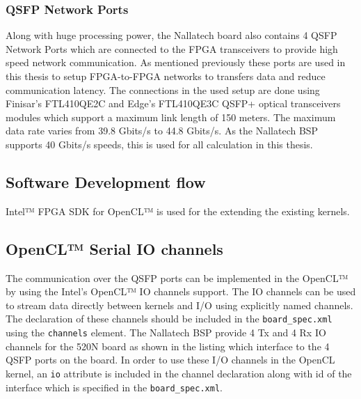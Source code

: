 \subsubsection*{QSFP Network Ports}

Along with huge processing power, the Nallatech board also contains 4 QSFP Network Ports which
are connected to the FPGA transceivers to provide high speed network communication. As mentioned
previously these ports are used in this thesis to setup FPGA-to-FPGA networks to transfers data
and reduce communication latency. The connections in the used setup are done using 
Finisar's FTL410QE2C and Edge's FTL410QE3C QSFP+ optical transceivers modules which support a
maximum link length of 150 meters. The maximum data rate varies from 39.8 Gbits/s to 44.8 Gbits/s.
As the Nallatech BSP supports 40 Gbits/s speeds, this is used for all calculation in this thesis.


\subsection{Software Development flow}

Intel™ FPGA SDK for OpenCL™ is used for the extending the existing kernels.

\subsection{OpenCL™ Serial IO channels}

The communication over the QSFP ports can be implemented in the OpenCL™ by using the
Intel's OpenCL™ IO channels support. The IO channels can be used to stream data
directly between kernels and I/O using explicitly named channels. The declaration
of these channels should be included in the \texttt{board\_spec.xml} using the 
\texttt{channels} element. The Nallatech BSP provide 4 Tx and 4 Rx IO channels for the 520N board
as shown in the listing {} which interface to the 4 QSFP ports on the board.
In order to use these I/O channels in the OpenCL kernel,
an \texttt{io} attribute is included in the channel declaration along with id of
the interface which is specified in the \texttt{board\_spec.xml}. 

